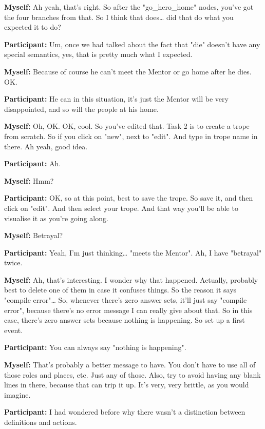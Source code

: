 \documentclass[11pt]{report}
\newcommand{\llabel}[1]{\hypertarget{llineno:#1}{\linelabel{#1}}}
\begin{document}
\begin{linenumbers}
\textbf{Myself:} Ah yeah, that's right. So after the "go_hero_home" nodes, you've got the four branches from that. So I think that does\ldots{} did that do what you expected it to do?

\textbf{Participant:} Um, once we had talked about the fact that "die" doesn't have any special semantics, yes, that is pretty much what I expected.\llabel{lne:feature4h2}

\textbf{Myself:} Because of course he can't meet the Mentor or go home after he dies. OK.

\textbf{Participant:} He can in this situation, it's just the Mentor will be very disappointed, and so will the people at his home.

\textbf{Myself:} Oh, OK. OK, cool. So you've edited that. Task 2 is to create a trope from scratch. So if you click on "new", next to "edit". And type in trope name in there. Ah yeah, good idea.

\textbf{Participant:} Ah.

\textbf{Myself:} Hmm?

\textbf{Participant:} OK, so at this point, best to save the trope. So save it, and then click on "edit". And then select your trope. And that way you'll be able to visualise it as you're going along.

\textbf{Myself:} Betrayal?

\textbf{Participant:} Yeah, I'm just thinking\ldots{} "meets the Mentor". Ah, I have "betrayal" twice.

\textbf{Myself:} Ah, that's interesting. I wonder why that happened. Actually, probably best to delete one of them in case it confuses things. So the reason it says "compile error"\ldots{} So, whenever there's zero answer sets, it'll just say "compile error", because there's no error message I can really give about that. So in this case, there's zero answer sets because nothing is happening. So set up a first event.

\textbf{Participant:} You can always say "nothing is happening".

\textbf{Myself:} That's probably a better message to have. You don't have to use all of those roles and places, etc. Just any of those. Also, try to avoid having any blank lines in there, because that can trip it up. It's very, very brittle, as you would imagine.

\textbf{Participant:} I had wondered before why there wasn't a distinction between definitions and actions.


\end{linenumbers}
\end{document}
